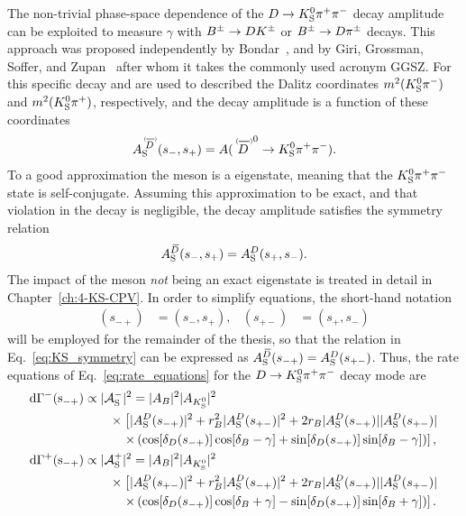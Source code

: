 The non-trivial phase-space dependence of the ${D}\rightarrow{\ensuremath{{K}^0_{\mathrm{S}}}}{\ensuremath{{\pi}^+}}{\ensuremath{{\pi}^-}}$ decay amplitude can be exploited to measure $\gamma$ with ${{B}^\pm}\rightarrow {\ensuremath{D}}{\ensuremath{{K}^\pm}}$ or ${{B}^\pm}\rightarrow {\ensuremath{D}}{\ensuremath{{\pi}^\pm}}$ decays. This approach was proposed independently by Bondar~\cite{BONDARGGSZ}, and by Giri, Grossman, Soffer, and Zupan~\cite{giriDeterminingEnsuremathGamma2003} after whom it takes the commonly used acronym GGSZ. For this specific decay \sm and \sp are used to described the Dalitz coordinates $m^2({{K}^0_{\mathrm{S}}}{{\pi}^-})$ and $m^2({{K}^0_{\mathrm{S}}}{{\pi}^+})$, respectively, and the \D decay amplitude is a function of these coordinates
\begin{align}\label{eq:ADDb_definition}
\ADorDbS (\smpLong)= A(\DorDbar^0\to K^0_\text{S} \pi^+\pi^-).
\end{align}
To a good approximation the \KS meson is a \CP eigenstate, meaning that the ${{K}^0_{\mathrm{S}}}{{\pi}^+}{{\pi}^-}$ state is self-conjugate. Assuming this approximation to be exact, and that \CP violation in the \D decay is negligible, the \D decay amplitude satisfies the symmetry relation
\begin{align}\label{eq:KS_symmetry}
     A_{\rm S}^{{\kern 0.18em\overline{\kern -0.18em D}}}(s_-, s_+)=A_{\rm S}^{D}(s_+, s_-).
 \end{align} 
 The impact of the \KS meson \emph{not} being an exact \CP eigenstate is treated in detail in Chapter~\ref{ch:4-KS-CPV}. In order to simplify equations, the short-hand notation 
 \begin{align}
     (s_{-+})&=(s_-,s_+), &(s_{+-})&=(s_+,s_-)
 \end{align} will be employed for the remainder of the thesis, so that the relation in Eq.~\eqref{eq:KS_symmetry} can be expressed as $A_{\rm S}^{{\kern 0.18em\overline{\kern -0.18em D}}}(s_{-+})=A_{\rm S}^{D}(s_{+-})$. Thus, the rate equations of Eq.~\eqref{eq:rate_equations} for the ${D}\rightarrow{\ensuremath{{K}^0_{\mathrm{S}}}}{\ensuremath{{\pi}^+}}{\ensuremath{{\pi}^-}}$ decay mode are
 \begin{subequations}\label{eq:Gamma_Bminus}
\begin{align} 
    \rm {d} \Gamma^-(s_{-+}) &\propto |\mathcal{A}_{\rm S}^-|^2 = |A_{B}|^2|A_{{{K}^0_{\mathrm{S}}}}|^2 \notag \\
    &\qquad\times\left[|A_{\rm S}^{D}(s_{-+})|^2 + r_{B}^2 |A_{\rm S}^{D}(s_{+-})|^2 + 2r_{B} |A_{\rm S}^{D}(s_{-+})||A_{\rm S}^{D}(s_{+-})|\right .
    \notag \\
    &\quad\qquad \left. \times \left(\cos[\delta_D(s_{-+})]\cos[\delta_{B}-\gamma]+\sin[\delta_D(s_{-+})]\sin[\delta_{B}-\gamma]\right)\right], \\
    \rm {d} \Gamma^+(s_{-+}) &\propto |\mathcal{A}_{\rm S}^+|^2 = |A_{B}|^2|A_{{{K}^0_{\mathrm{S}}}}|^2 \notag \\
    &\qquad\times\left[|A_{\rm S}^{D}(s_{+-})|^2 + r_{B}^2 |A_{\rm S}^{D}(s_{-+})|^2 + 2r_{B} |A_{\rm S}^{D}(s_{-+})||A_{\rm S}^{D}(s_{+-})|\right .
    \notag \\
    &\quad\qquad \left. \times \left(\cos[\delta_D(s_{-+})]\cos[\delta_{B}+\gamma]-\sin[\delta_D(s_{-+})]\sin[\delta_{B}+\gamma]\right)\right].
\end{align}
\end{subequations}

